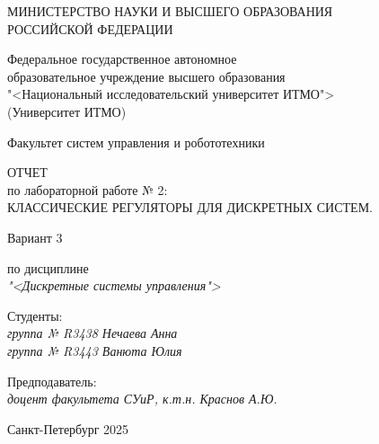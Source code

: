 \thispagestyle{empty}

\begin{center}
    МИНИСТЕРСТВО НАУКИ И ВЫСШЕГО ОБРАЗОВАНИЯ \\ РОССИЙСКОЙ ФЕДЕРАЦИИ

    \vspace{20pt}

    Федеральное государственное автономное \\ образовательное учреждение высшего образования \\
    "<Национальный исследовательский университет ИТМО"> \\
    (Университет ИТМО)

    \vspace{20pt}

    Факультет систем управления и робототехники 
\end{center}

\vfill

\begin{center}
	ОТЧЕТ \\  
	по лабораторной работе № 2: \\
	\uppercase{Классические регуляторы для дискретных систем.}
	\vspace{20pt}
	
	Вариант 3 \\
	
	\vspace{20pt}
	
	по дисциплине \\
	\textit{"<Дискретные системы управления">}
	
\end{center}

\vfill

\noindent Студенты: \\
\textit{группа № R3438 \hfill Нечаева Анна}\\
\textit{группа № R3443 \hfill Ванюта Юлия}

\vspace{20pt}

\noindent Предподаватель: \\
\textit{доцент факультета СУиР, к.т.н. \hfill Краснов А.Ю.}

\vfill

\begin{center}
    Санкт-Петербург 2025
\end{center}